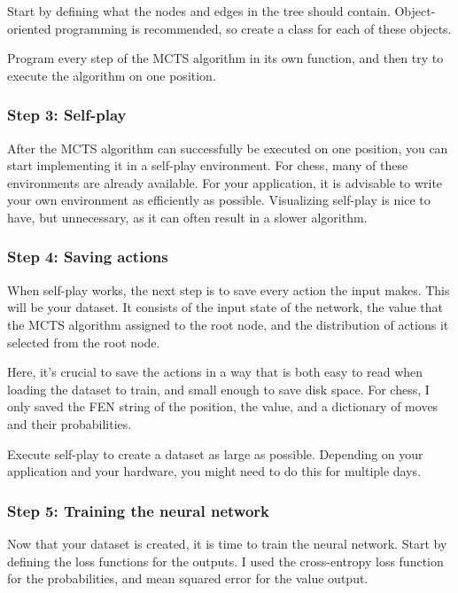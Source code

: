 \documentclass{article}
\begin{document}
Start by defining what the nodes and edges in the tree should contain. Object-oriented programming is recommended,
so create a class for each of these objects. 

Program every step of the MCTS algorithm in its own function, and then try to execute the algorithm on 
one position.

\subsubsection{Step 3: Self-play}

After the MCTS algorithm can successfully be executed on one position, you can start implementing it 
in a self-play environment. For chess, many of these environments are already available. For your application,
it is advisable to write your own environment as efficiently as possible. Visualizing self-play is nice to have,
but unnecessary, as it can often result in a slower algorithm.

\subsubsection{Step 4: Saving actions}

When self-play works, the next step is to save every action the input makes. This will be your dataset. 
It consists of the input state of the network, the value that the MCTS algorithm assigned to the root node, 
and the distribution of actions it selected from the root node.

Here, it's crucial to save the actions in a way that is both easy to read when loading the dataset to train,
and small enough to save disk space. For chess, I only saved the FEN string of the position, the value, and a dictionary
of moves and their probabilities.

Execute self-play to create a dataset as large as possible. Depending on your application and your hardware, 
you might need to do this for multiple days. 

\subsubsection{Step 5: Training the neural network}

Now that your dataset is created, it is time to train the neural network. 
Start by defining the loss functions for the outputs. I used the cross-entropy loss function for the probabilities,
and mean squared error for the value output.
\end{document}
